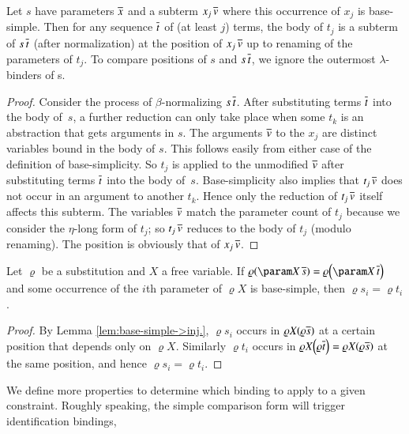  \begin{lemma}\label{lem:base-simple->inj.}
  Let $s$ have parameters $\overline{x}$ and a subterm $x_{j}\,\overline{v}$ 
  where this occurrence of $x_{j}$ is base-simple.
  Then for any sequence $\overline{t}$ of (at least $j$) terms, the body of
  $t_{j}$ is a subterm of $s\,\overline{t}$ (after normalization) at the position
  of $x_{j}\,\overline{v}$ up to renaming of the parameters of $t_{j}$. 
  To compare positions of $s$ and $s\,\overline{t}$, we ignore
  the outermost $\lambda$-binders of s.
  \end{lemma}
  \begin{proof}
  Consider the process of $\beta$-normalizing $s\,\overline{t}$. After substituting
  terms $\overline{t}$ into the body of~$s$, a further reduction can only
  take place when some $t_{k}$ is an abstraction that gets arguments in
  $s$. The arguments $\overline{v}$ to the $x_{j}$ are distinct variables
  bound in the body of $s$. This follows easily from either case of the
  definition of base-simplicity. So $t_{j}$ is applied to the unmodified
  $\overline{v}$ after substituting
  terms $\overline{t}$ into the body of~$s$. Base-simplicity also implies
  that $t_{j}\,\overline{v}$ does not occur in an argument to another
  $t_{k}$. Hence only the reduction of $t_{j}\,\overline{v}$ itself affects this
  subterm. The variables $\overline{v}$ match the parameter count of $t_{j}$
  because we consider the $\eta$-long form of $t_{j}$; so $t_{j}\,\overline{v}$ reduces to the body
  of $t_{j}$ (modulo renaming). The position is obviously that of $x_{j}\,\overline{v}$.
  \end{proof}
  \begin{lemma}[$\jp C{4 strengthened}$]\label{lem:eq-if-omega-simple}Let $\varrho$ be a substitution and $X$ a free
    variable. If $\varrho\left(\param X\,\seq s\right)=\varrho\left(\param X\,\seq t\right)$
    and some occurrence of the $i$th parameter of $\varrho X$
    is base-simple, then $\varrho s_{i}=\varrho t_{i}$.
    \end{lemma}
    \begin{proof}
    By Lemma \ref{lem:base-simple->inj.}, $\varrho s_{i}$ occurs in
    $\varrho X\left(\varrho\seq s\right)$ at a certain position that depends
    only on $\varrho X$. Similarly $\varrho t_{i}$ occurs in $\varrho X\left(\varrho\seq t\right)=\varrho X\left(\varrho\seq s\right)$
    at the same position, and hence $\varrho s_{i}=\varrho t_{i}$.
    \end{proof}
    We define more properties to determine which binding to apply to a given constraint.
    Roughly speaking, the simple comparison form will trigger identification bindings,

